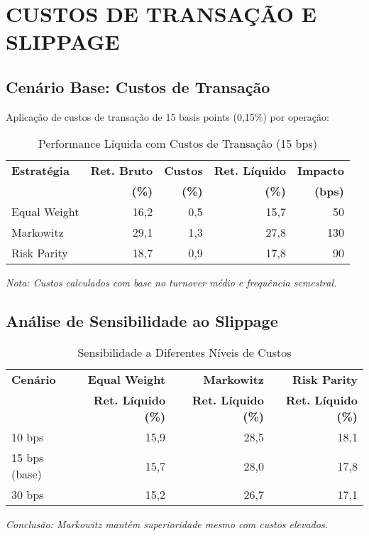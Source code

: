 \section{CUSTOS DE TRANSAÇÃO E SLIPPAGE}

\subsection{Cenário Base: Custos de Transação}

Aplicação de custos de transação de 15 basis points (0,15\%) por operação:

\begin{table}[H]
\centering
\caption{Performance Líquida com Custos de Transação (15 bps)}
\begin{tabular}{|l|r|r|r|r|}
\hline
\textbf{Estratégia} & \textbf{Ret. Bruto} & \textbf{Custos} & \textbf{Ret. Líquido} & \textbf{Impacto} \\
& \textbf{(\%)} & \textbf{(\%)} & \textbf{(\%)} & \textbf{(bps)} \\
\hline
Equal Weight & 16,2 & 0,5 & 15,7 & 50 \\
\hline
Markowitz & 29,1 & 1,3 & 27,8 & 130 \\
\hline
Risk Parity & 18,7 & 0,9 & 17,8 & 90 \\
\hline
\end{tabular}

\textit{Nota: Custos calculados com base no turnover médio e frequência semestral.}
\label{tab:custos_transacao}
\end{table}

\subsection{Análise de Sensibilidade ao Slippage}

\begin{table}[H]
\centering
\caption{Sensibilidade a Diferentes Níveis de Custos}
\begin{tabular}{|l|r|r|r|}
\hline
\textbf{Cenário} & \textbf{Equal Weight} & \textbf{Markowitz} & \textbf{Risk Parity} \\
& \textbf{Ret. Líquido (\%)} & \textbf{Ret. Líquido (\%)} & \textbf{Ret. Líquido (\%)} \\
\hline
10 bps & 15,9 & 28,5 & 18,1 \\
\hline
15 bps (base) & 15,7 & 28,0 & 17,8 \\
\hline
30 bps & 15,2 & 26,7 & 17,1 \\
\hline
\end{tabular}

\textit{Conclusão: Markowitz mantém superioridade mesmo com custos elevados.}
\label{tab:sensibilidade_custos}
\end{table}

